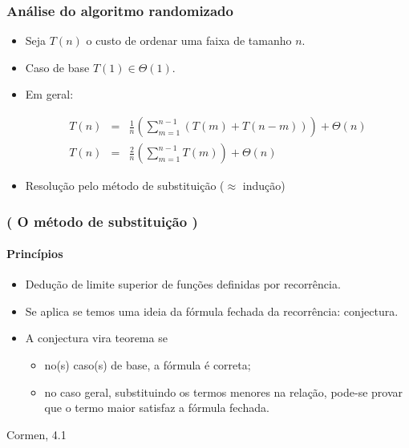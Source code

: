 \documentclass{beamer}
\begin{document}
\begin{frame}

  \frametitle{Análise do algoritmo randomizado}

  \begin{itemize}

    \item Seja $T(n)$ o custo de ordenar uma faixa de tamanho $n$.

    \item Caso de base $T(1) \in \Theta(1)$.

    \item Em geral:

      \begin{small}
      \begin{eqnarray*}
      T(n) & = &
      \frac{1}{n}\left(\sum_{m=1}^{n-1} (T(m) + T(n-m)) \right) + \Theta(n) \\
      T(n) & = &
      \frac{2}{n}\left(\sum_{m=1}^{n-1} T(m) \right) + \Theta(n)
      \end{eqnarray*}
      \end{small}

    \item Resolução pelo \alert{método de substituição} ($\approx$ indução)

  \end{itemize}

\end{frame}

\begin{frame}

\frametitle{( O método de substituição )}
\framesubtitle{Princípios}
\begin{itemize}
  \item Dedução de limite superior de funções definidas por recorrência.
  \item Se aplica se temos uma ideia da fórmula fechada da recorrência:
    \alert{conjectura}.
  \item A conjectura vira \alert{teorema} se
    \begin{itemize}
    \item no(s) caso(s) de base, a fórmula é correta;
    \item no caso geral, substituindo os termos menores na relação, 
      pode-se provar que o termo maior satisfaz a fórmula fechada.
    \end{itemize}
\end{itemize}
\alert{Cormen, 4.1}
\end{frame}
\end{document}
